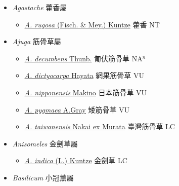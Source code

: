 
  \begin{itemize}
 \item[] \textit{Agastache} 藿香屬
                    
  \begin{itemize}
        \item[] \href{http://www.theplantlist.org/tpl1.1/search?q=Agastache+rugosa}{\textit{A. rugosa} (Fisch. \& Mey.) Kuntze}   藿香 NT
  \end{itemize}
 \item[] \textit{Ajuga} 筋骨草屬
                    
  \begin{itemize}
        \item[] \href{http://www.theplantlist.org/tpl1.1/search?q=Ajuga+decumbens}{\textit{A. decumbens} Thunb.}   匍伏筋骨草 NA$^n$
        \item[] \href{http://www.theplantlist.org/tpl1.1/search?q=Ajuga+dictyocarpa}{\textit{A. dictyocarpa} Hayata}   網果筋骨草 VU
        \item[] \href{http://www.theplantlist.org/tpl1.1/search?q=Ajuga+nipponensis}{\textit{A. nipponensis} Makino}   日本筋骨草 VU
        \item[] \href{http://www.theplantlist.org/tpl1.1/search?q=Ajuga+pygmaea}{\textit{A. pygmaea} A.Gray}   矮筋骨草 VU
        \item[] \href{http://www.theplantlist.org/tpl1.1/search?q=Ajuga+taiwanensis}{\textit{A. taiwanensis} Nakai ex Murata}   臺灣筋骨草 LC
  \end{itemize}
 \item[] \textit{Anisomeles} 金劍草屬
                    
  \begin{itemize}
        \item[] \href{http://www.theplantlist.org/tpl1.1/search?q=Anisomeles+indica}{\textit{A. indica} (L.) Kuntze}   金劍草 LC
  \end{itemize}
 \item[] \textit{Basilicum} 小冠薰屬
                    

\end{itemize}
